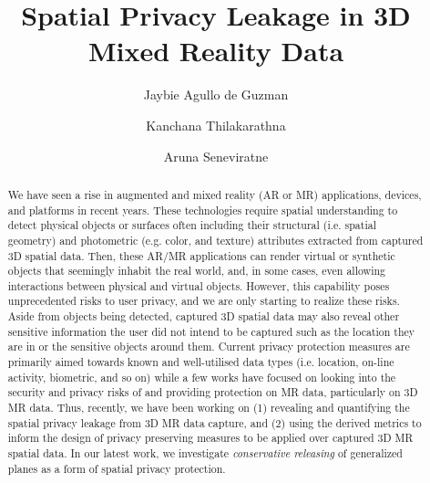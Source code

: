 \documentclass[sigconf]{acmart} %
\begin{document}
	

\title{Spatial Privacy Leakage in 3D Mixed Reality Data}

\author{Jaybie Agullo de Guzman}

\author{Kanchana Thilakarathna}

\author{Aruna Seneviratne}

\renewcommand{\shortauthors}{J. de Guzman, K. Thilakarathna, \& A. Seneviratne}

\begin{abstract}
We have seen a rise in augmented and mixed reality (AR or MR) applications, devices, and platforms in recent years. These technologies require spatial understanding to detect physical objects or surfaces often including their structural (i.e. spatial geometry) and photometric (e.g. color, and texture) attributes extracted from captured 3D spatial data. Then, these AR/MR applications can render virtual or synthetic objects that seemingly inhabit the real world, and, in some cases, even allowing interactions between physical and virtual objects. However, this capability poses unprecedented risks to user privacy, and we are only starting to realize these risks. Aside from objects being detected, captured 3D spatial data may also reveal other sensitive information the user did not intend to be captured such as the location they are in or the sensitive objects around them. Current privacy protection measures are primarily aimed towards known and well-utilised data types (i.e. location, on-line activity, biometric, and so on) while a few works have focused on looking into the security and privacy risks of and providing protection on MR data, particularly on 3D MR data. Thus, recently, we have been working on (1) revealing and quantifying the spatial privacy leakage from 3D MR data capture, and (2) using the derived metrics to inform the design of privacy preserving measures to be applied over captured 3D MR spatial data. In our latest work, we investigate \textit{conservative releasing} of generalized planes as a form of spatial privacy protection. %
\end{abstract}
\end{document}
